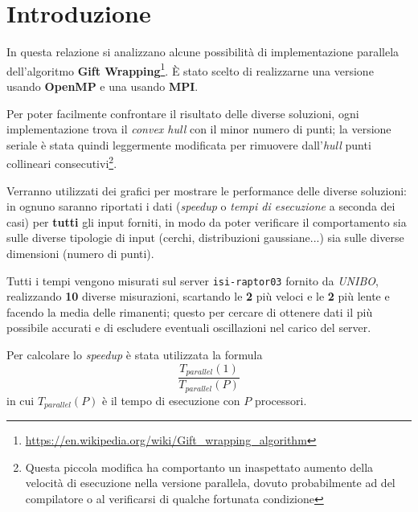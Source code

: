 \section{Introduzione}
In questa relazione si analizzano alcune possibilità di implementazione parallela dell'algoritmo \textbf{Gift Wrapping}\footnote{\url{https://en.wikipedia.org/wiki/Gift\_wrapping\_algorithm}}.
È stato scelto di realizzarne una versione usando \textbf{OpenMP} e una usando \textbf{MPI}.

Per poter facilmente confrontare il risultato delle diverse soluzioni, ogni implementazione trova il \emph{convex hull} con il minor numero di punti;
la versione seriale è stata quindi leggermente modificata per rimuovere dall'\emph{hull} punti collineari consecutivi\footnote{Questa piccola modifica ha comportanto un inaspettato aumento della velocità di esecuzione nella versione parallela, dovuto probabilmente ad del compilatore o al verificarsi di qualche fortunata condizione}.
 
Verranno utilizzati dei grafici per mostrare le performance delle diverse soluzioni:
in ognuno saranno riportati i dati (\emph{speedup} o \emph{tempi di esecuzione} a seconda dei casi) per \textbf{tutti} gli input forniti,
in modo da poter verificare il comportamento sia sulle diverse tipologie di input (cerchi, distribuzioni gaussiane...) sia sulle diverse dimensioni (numero di punti).

Tutti i tempi vengono misurati sul server \texttt{isi-raptor03} fornito da \emph{UNIBO}, realizzando \textbf{10} diverse misurazioni, scartando le \textbf{2} più veloci e le \textbf{2} più lente e facendo la media delle rimanenti;
questo per cercare di ottenere dati il più possibile accurati e di escludere eventuali oscillazioni nel carico del server.

Per calcolare lo \emph{speedup} è stata utilizzata la formula
\begin{equation}
    \frac{T_{parallel}(1)}{T_{parallel}(P)}
\end{equation}
in cui $T_{parallel}(P)$ è il tempo di esecuzione con $P$ processori.
